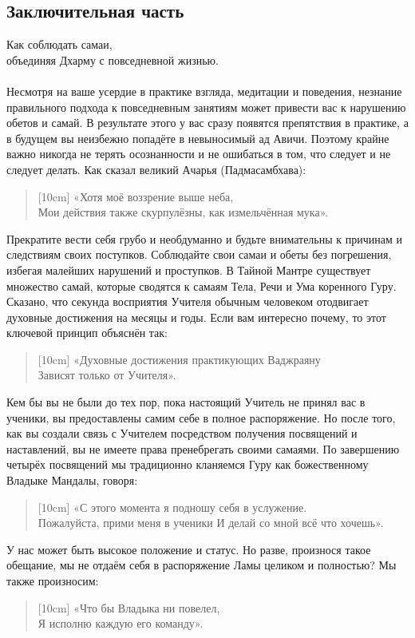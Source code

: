 \newpage
\subsection{Заключительная часть}
\large Как соблюдать самаи, \\ объединяя Дхарму с повседневной жизнью. \normalsize
\\
\\
Несмотря на ваше усердие в практике взгляда, медитации и поведения,
незнание правильного подхода к повседневным занятиям может привести
вас к нарушению обетов и самай. В результате этого у вас сразу
появятся препятствия в практике, а в будущем вы неизбежно попадёте
в невыносимый ад Авичи. Поэтому крайне важно никогда не терять
осознанности и не ошибаться в том, что следует и не следует делать.
Как сказал великий Ачарья (Падмасамбхава):
\begin{verse}[10cm]
«Хотя моё воззрение выше неба, \\
Мои действия также скурпулёзны, как измельчённая мука».
\end{verse}
Прекратите вести себя грубо и необдуманно и будьте внимательны
к причинам и следствиям своих поступков. Соблюдайте свои самаи
и обеты без погрешения, избегая малейших нарушений и проступков.
В Тайной Мантре существует множество самай, которые сводятся к
самаям Тела, Речи и Ума коренного Гуру. Сказано, что секунда
восприятия Учителя обычным человеком отодвигает духовные
достижения на месяцы и годы. Если вам интересно почему,
то этот ключевой принцип объяснён так:
\begin{verse}[10cm]
«Духовные достижения практикующих Ваджраяну \\
Зависят только от Учителя».
\end{verse}
Кем бы вы не были до тех пор, пока настоящий Учитель
не принял вас в ученики, вы предоставлены самим себе
в полное распоряжение. Но после того, как вы создали
связь с Учителем посредством получения посвящений и
наставлений, вы не имеете права пренебрегать своими
самаями. По завершению четырёх посвящений мы традиционно
кланяемся Гуру как божественному Владыке Мандалы, говоря:
\begin{verse}[10cm]
«С этого момента я подношу себя в услужение. \\
Пожалуйста, прими меня в ученики И делай со мной всё что хочешь».
\end{verse}
У нас может быть высокое положение и статус.
Но разве, произнося такое обещание, мы не отдаём себя в распоряжение
Ламы целиком и полностью? Мы также произносим:
\begin{verse}[10cm]
«Что бы Владыка ни повелел, \\
Я исполню каждую его команду».
\end{verse}
